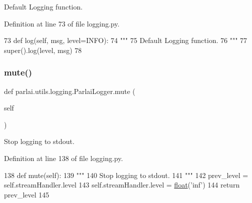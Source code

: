 \begin{DoxyVerb}Default Logging function.
\end{DoxyVerb}
 

Definition at line 73 of file logging.\+py.


\begin{DoxyCode}
73     \textcolor{keyword}{def }log(self, msg, level=INFO):
74         \textcolor{stringliteral}{"""}
75 \textcolor{stringliteral}{        Default Logging function.}
76 \textcolor{stringliteral}{        """}
77         super().log(level, msg)
78 
\end{DoxyCode}
\mbox{\label{classparlai_1_1utils_1_1logging_1_1ParlaiLogger_a560f0cf26c3eaae2d785c4f35cae2c4b}} 
\subsubsection{\texorpdfstring{mute()}{mute()}}
{\footnotesize\ttfamily def parlai.\+utils.\+logging.\+Parlai\+Logger.\+mute (\begin{DoxyParamCaption}\item[{}]{self }\end{DoxyParamCaption})}

\begin{DoxyVerb}Stop logging to stdout.
\end{DoxyVerb}
 

Definition at line 138 of file logging.\+py.


\begin{DoxyCode}
138     \textcolor{keyword}{def }mute(self):
139         \textcolor{stringliteral}{"""}
140 \textcolor{stringliteral}{        Stop logging to stdout.}
141 \textcolor{stringliteral}{        """}
142         prev\_level = self.streamHandler.level
143         self.streamHandler.level = \hyperlink{namespaceprojects_1_1controllable__dialogue_1_1make__control__dataset_aa2b7207688c641dbc094ab44eca27113}{float}(\textcolor{stringliteral}{'inf'})
144         \textcolor{keywordflow}{return} prev\_level
145 
\end{DoxyCode}
\mbox{\label{classparlai_1_1utils_1_1logging_1_1ParlaiLogger_a22d5f670d10de4270b40bf3c683a9fd1}} 
